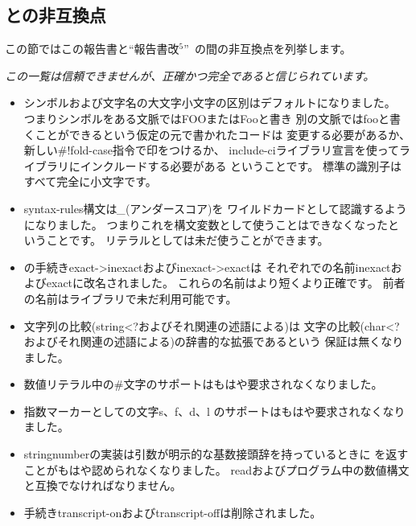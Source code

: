 

\subsection*{\rfivers{}との非互換点}
\label{incompatibilities}

この節ではこの報告書と``報告書改$^5$''~\cite{R5RS}の間の非互換点を列挙します。

{\em この一覧は信頼できませんが、正確かつ完全であると信じられています。}


\begin{itemize}

\item シンボルおよび文字名の大文字小文字の区別はデフォルトになりました。
つまりシンボルをある文脈では{\cf FOO}または{\cf Foo}と書き
別の文脈では{\cf foo}と書くことができるという仮定の元で書かれたコードは
変更する必要があるか、新しい{\cf \#!fold-case}指令で印をつけるか、
{\cf include-ci}ライブラリ宣言を使ってライブラリにインクルードする必要がある
ということです。
標準の識別子はすべて完全に小文字です。

\item {\cf syntax-rules}構文は{\em \_}(アンダースコア)を
ワイルドカードとして認識するようになりました。
つまりこれを構文変数として使うことはできなくなったということです。
リテラルとしては未だ使うことができます。

\item \rfivers{}の手続き{\cf exact->\+inexact}および{\cf inexact->\+exact}は
それぞれ\rsixrs{}での名前{\cf inexact}および{\cf exact}に改名されました。
これらの名前はより短くより正確です。
前者の名前は\rfivers{}ライブラリで未だ利用可能です。

\item 文字列の比較({\cf string<?}およびそれ関連の述語による)は
文字の比較({\cf char<?}およびそれ関連の述語による)の辞書的な拡張であるという
保証は無くなりました。

\item 数値リテラル中の\#文字のサポートはもはや要求されなくなりました。

\item 指数マーカーとしての文字{\cf s}、{\cf f}、{\cf d}、{\cf l}
のサポートはもはや要求されなくなりました。

\item {\cf string\coerce{}number}の実装は引数が明示的な基数接頭辞を持っているときに
\schfalse{}を返すことがもはや認められなくなりました。
{\cf read}およびプログラム中の数値構文と互換でなければなりません。

\item 手続き{\cf transcript-on}および{\cf transcript-off}は削除されました。

\end{itemize}

